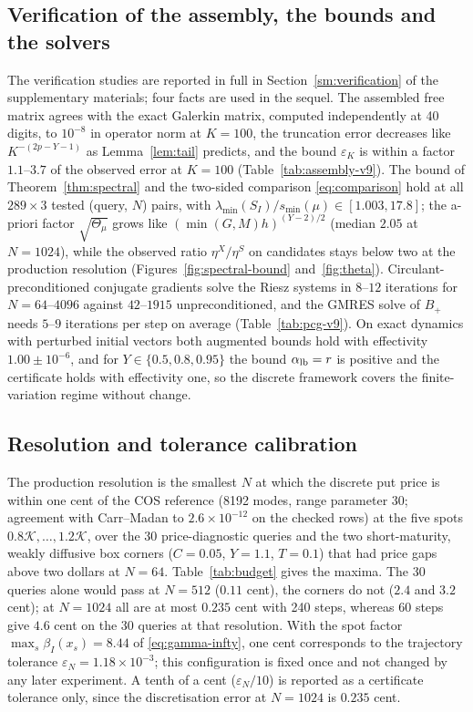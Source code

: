 \documentclass[hidelinks]{siamart251216}
\newcommand{\rf}{r}
\newcommand{\smin}{s_{\min}}
\newcommand{\Thmu}{\Theta_\mu}
\newcommand{\todo}[1]{\textcolor{red!70!black}{[\textbf{TODO:} #1]}}
\begin{document}
\subsection{Verification of the assembly, the bounds and the solvers}
\label{ssec:verification}\label{ssec:e0-assembly}\label{ssec:e0-spectral}\label{ssec:e0-riesz}\label{ssec:e0-initial}
The verification studies are reported in full in Section~\ref{sm:verification} of the supplementary
materials; four facts are used in the sequel.  The assembled free matrix agrees with the exact
Galerkin matrix, computed independently at 40 digits, to $10^{-8}$ in operator norm at $K=100$, the
truncation error decreases like $K^{-(2p-Y-1)}$ as Lemma~\ref{lem:tail} predicts, and the bound
$\varepsilon_K$ is within a factor $1.1$--$3.7$ of the observed error at $K=100$
(Table~\ref{tab:assembly-v9}).  The bound of Theorem~\ref{thm:spectral} and the two-sided comparison
\eqref{eq:comparison} hold at all $289\times3$ tested (query, $N$) pairs, with
$\lambda_{\min}(S_I)/\smin(\mu)\in[1.003,17.8]$; the a-priori factor $\sqrt{\Thmu}$ grows like
$(\min(G,M)h)^{(Y-2)/2}$ (median $2.05$ at $N=1024$), while the observed ratio $\eta^X/\eta^S$ on
candidates stays below two at the production resolution (Figures~\ref{fig:spectral-bound}
and~\ref{fig:theta}).  Circulant-preconditioned conjugate gradients solve the Riesz systems in
$8$--$12$ iterations for $N=64$--$4096$ against $42$--$1915$ unpreconditioned, and the GMRES solve of
$B_+$ needs $5$--$9$ iterations per step on average (Table~\ref{tab:pcg-v9}).  On exact dynamics with
perturbed initial vectors both augmented bounds hold with effectivity $1.00\pm10^{-6}$, and for
$Y\in\{0.5,0.8,0.95\}$ the bound $\alpha_{\rm lb}=\rf$ is positive and the certificate holds with
effectivity one, so the discrete framework covers the finite-variation regime without change.
\subsection{Resolution and tolerance calibration}
\label{ssec:calibration}
The production resolution is the smallest $N$ at which the discrete put price is within one cent
of the COS reference \cite{FangOosterlee2008} (8192 modes, range parameter 30; agreement with
Carr--Madan to $2.6\times10^{-12}$ on the checked rows) at the five spots $0.8\mathcal K,\dots,1.2\mathcal K$, over the
30 price-diagnostic queries and the two short-maturity, weakly diffusive box corners
($C=0.05$, $Y=1.1$, $T=0.1$) that had price gaps above two dollars at $N=64$.
Table~\ref{tab:budget} gives the maxima.  The 30 queries alone would pass at $N=512$ ($0.11$ cent),
the corners do not ($2.4$ and $3.2$ cent); at $N=1024$ all are at most $0.235$ cent with 240 steps,
whereas 60 steps give $4.6$ cent on the 30 queries at that resolution.  With the spot factor
$\max_s\beta_I(x_s)=8.44$ of \eqref{eq:gamma-infty}, one cent corresponds to the trajectory
tolerance $\varepsilon_N=1.18\times10^{-3}$; this configuration is fixed once and not changed by
any later experiment.  A tenth of a cent ($\varepsilon_N/10$) is reported as a certificate
tolerance only, since the discretisation error at $N=1024$ is $0.235$ cent.
\IfFileExists{../tables_v9/tab_budget_v9.tex}{}{\todo{Table pending}}
\end{document}
